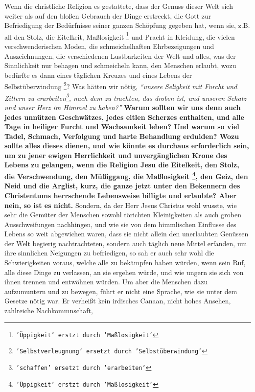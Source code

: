 Wenn die christliche Religion es gestattete, dass der Genuss dieser Welt sich
weiter als auf den bloßen Gebrauch der Dinge erstreckt, die Gott zur
Befriedigung der Bedürfnisse seiner ganzen Schöpfung gegeben hat, wenn sie, z.B. all den Stolz, die Eitelkeit, Maßlosigkeit
\footnote{\texttt{'Üppigkeit' erstzt durch 'Maßlosigkeit'}}
und Pracht in Kleidung, die vielen
verschwenderischen Moden, die schmeichelhaften Ehrbezeigungen und
Auszeichnungen, die verschiedenen Lustbarkeiten der Welt und alles, was der
Sinnlichkeit nur behagen und schmeicheln kann, den Menschen erlaubt, wozu
bedürfte es dann eines täglichen Kreuzes und eines Lebens der Selbstüberwindung
\footnote{\texttt{'Selbstverleugnung' ersetzt durch 'Selbstüberwindung'}}?
Was hätten wir nötig,
\textit{"`unsere Seligkeit mit Furcht und Zittern zu erarbeiten\footnote{\texttt{'schaffen' ersetzt durch 'erarbeiten'}},
nach dem zu trachten, das droben ist, und unseren Schatz und unser Herz im Himmel
zu haben?"'}
\textbf{Warum sollten wir uns denn auch jedes unnützen Geschwätzes, jedes
eitlen Scherzes enthalten, und alle Tage in heiliger Furcht und Wachsamkeit
leben? Und warum so viel Tadel, Schmach, Verfolgung und harte Behandlung
erdulden? Wozu sollte alles dieses dienen, und wie könnte es durchaus
erforderlich sein, um zu jener ewigen Herrlichkeit und unvergänglichen Krone
des Lebens zu gelangen, wenn die Religion Jesu die Eitelkeit, den Stolz, die
Verschwendung, den Müßiggang, die Maßlosigkeit
\footnote{\texttt{'Üppigkeit' erstzt durch 'Maßlosigkeit'}},
den Geiz, den Neid und die
Arglist, kurz, die ganze jetzt unter den Bekennern des Christentums
herrschende Lebensweise billigte und erlaubte? Aber nein, so ist es nicht.}
Sondern, da der Herr Jesus Christus wohl wusste, wie sehr die Gemüter der
Menschen sowohl törichten Kleinigkeiten als auch groben Ausschweifungen
nachhingen, und wie sie von dem himmlischen Einflusse des Lebens so weit
abgewichen waren, dass sie nicht allein den unerlaubten Genüssen der Welt
begierig nachtrachteten, sondern auch täglich neue Mittel erfanden, um ihre
sinnlichen Neigungen zu befriedigen, so sah er auch sehr wohl die
Schwierigkeiten voraus, welche alle zu bekämpfen haben würden, wenn sein Ruf,
alle diese Dinge zu verlassen, an sie ergehen würde, und wie ungern sie sich von
ihnen trennen und entwöhnen würden. Um aber die Menschen dazu aufzumuntern und
zu bewegen, führt er nicht eine Sprache, wie sie unter dem Gesetze nötig war. Er
verheißt kein irdisches Canaan, nicht hohes Ansehen, zahlreiche Nachkommnschaft,
